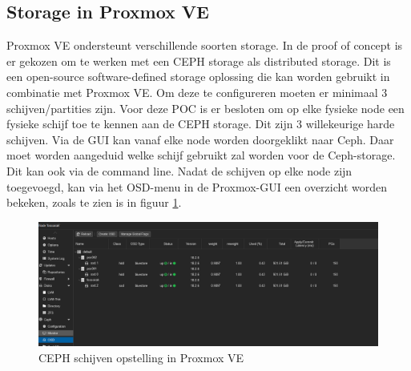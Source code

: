 \subsection{Storage in Proxmox VE}
\label{sec:storage_proxmox}
Proxmox VE ondersteunt verschillende soorten storage. In de proof of concept is er gekozen om te werken met een CEPH storage als distributed storage. Dit is een open-source software-defined storage oplossing die kan worden gebruikt in combinatie met Proxmox VE.
Om deze te configureren moeten er minimaal 3 schijven/partities zijn. Voor deze POC is er besloten om op elke fysieke node een fysieke schijf toe te kennen aan de CEPH storage. Dit zijn 3 willekeurige harde schijven.
Via de GUI kan vanaf elke node worden doorgeklikt naar Ceph. Daar moet worden aangeduid welke schijf gebruikt zal worden voor de Ceph-storage. Dit kan ook via de command line.
Nadat de schijven op elke node zijn toegevoegd, kan via het OSD-menu in de Proxmox-GUI een overzicht worden bekeken, zoals te zien is in figuur \ref{fig:osd-ceph-proxmox}.
\begin{figure}[H]
  \centering
  \includegraphics[width=1.2\textwidth]{../poc/ceph-osd-prox.png}
  \caption{CEPH schijven opstelling in Proxmox VE}
  \label{fig:osd-ceph-proxmox}
\end{figure}

